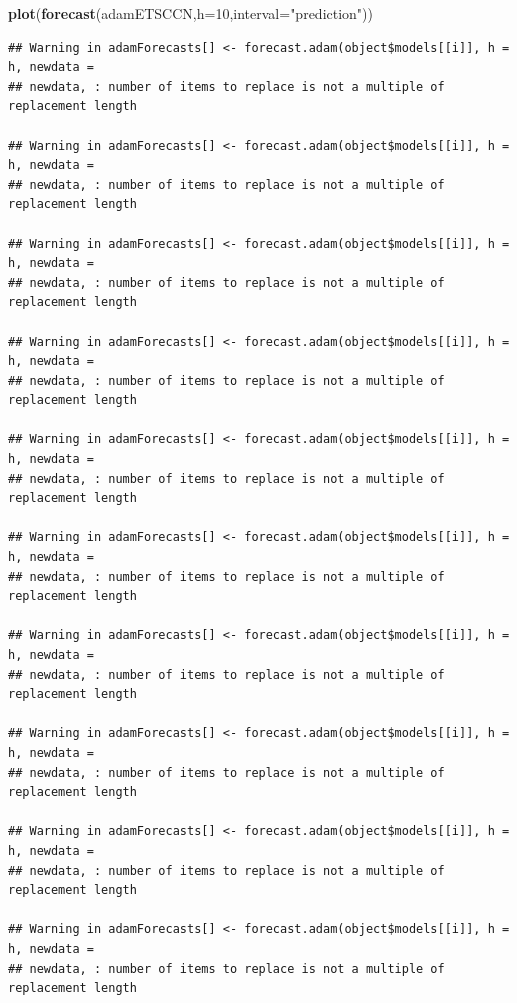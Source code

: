 \documentclass[]{book}
\newenvironment{Shaded}{\begin{snugshade}}{\end{snugshade}}
\newcommand{\DataTypeTok}[1]{\textcolor[rgb]{0.13,0.29,0.53}{#1}}
\newcommand{\DecValTok}[1]{\textcolor[rgb]{0.00,0.00,0.81}{#1}}
\newcommand{\KeywordTok}[1]{\textcolor[rgb]{0.13,0.29,0.53}{\textbf{#1}}}
\newcommand{\NormalTok}[1]{#1}
\newcommand{\StringTok}[1]{\textcolor[rgb]{0.31,0.60,0.02}{#1}}
\theoremstyle{definition}
\theoremstyle{definition}
\theoremstyle{definition}
\theoremstyle{definition}
\theoremstyle{remark}
\begin{document}
\begin{Shaded}
\begin{Highlighting}[]
\KeywordTok{plot}\NormalTok{(}\KeywordTok{forecast}\NormalTok{(adamETSCCN,}\DataTypeTok{h=}\DecValTok{10}\NormalTok{,}\DataTypeTok{interval=}\StringTok{"prediction"}\NormalTok{))}
\end{Highlighting}
\end{Shaded}

\begin{verbatim}
## Warning in adamForecasts[] <- forecast.adam(object$models[[i]], h = h, newdata =
## newdata, : number of items to replace is not a multiple of replacement length

## Warning in adamForecasts[] <- forecast.adam(object$models[[i]], h = h, newdata =
## newdata, : number of items to replace is not a multiple of replacement length

## Warning in adamForecasts[] <- forecast.adam(object$models[[i]], h = h, newdata =
## newdata, : number of items to replace is not a multiple of replacement length

## Warning in adamForecasts[] <- forecast.adam(object$models[[i]], h = h, newdata =
## newdata, : number of items to replace is not a multiple of replacement length

## Warning in adamForecasts[] <- forecast.adam(object$models[[i]], h = h, newdata =
## newdata, : number of items to replace is not a multiple of replacement length

## Warning in adamForecasts[] <- forecast.adam(object$models[[i]], h = h, newdata =
## newdata, : number of items to replace is not a multiple of replacement length

## Warning in adamForecasts[] <- forecast.adam(object$models[[i]], h = h, newdata =
## newdata, : number of items to replace is not a multiple of replacement length

## Warning in adamForecasts[] <- forecast.adam(object$models[[i]], h = h, newdata =
## newdata, : number of items to replace is not a multiple of replacement length

## Warning in adamForecasts[] <- forecast.adam(object$models[[i]], h = h, newdata =
## newdata, : number of items to replace is not a multiple of replacement length

## Warning in adamForecasts[] <- forecast.adam(object$models[[i]], h = h, newdata =
## newdata, : number of items to replace is not a multiple of replacement length
\end{verbatim}
\end{document}
